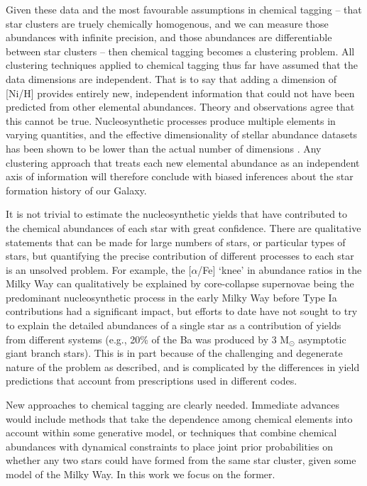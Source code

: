 \documentclass[twocolumn]{aastex62}
\begin{document}
Given these data and the most favourable assumptions in chemical tagging 
-- that star clusters are truely chemically homogenous, and we can measure 
those abundances with infinite precision, and those abundances are 
differentiable between star clusters -- then chemical
tagging becomes a clustering problem. All clustering techniques applied to 
chemical tagging thus far have assumed that the data dimensions are independent. That is to say
that adding a dimension of [Ni/H] provides entirely new, independent information
that could not have been predicted from other elemental abundances.
Theory and observations agree that this cannot be true.
Nucleosynthetic processes produce multiple elements in varying
quantities, and the effective dimensionality of stellar abundance datasets has been shown
to be lower than the actual number of dimensions \citep{Price-Jones:2018}.
Any clustering approach that treats each new elemental abundance as an 
independent axis of information will therefore conclude with biased inferences
about the star formation history of our Galaxy. 


It is not trivial to estimate
the nucleosynthetic yields that have contributed to the chemical abundances of each star
with great confidence. There are
qualitative statements that can be made for large numbers of stars, or particular
types of stars, but quantifying the precise contribution of different processes
to each star is an unsolved problem. For example, the [$\alpha$/Fe] `knee' in
abundance ratios in the Milky Way can qualitatively be explained by 
core-collapse supernovae being the predominant nucleosynthetic process in the
early Milky Way before Type Ia contributions had a significant impact, but 
efforts to date have not sought to try to explain the detailed abundances of a 
single star as a contribution of yields from different systems (e.g., 20\% of the
Ba was produced by 3 M$_\odot$ asymptotic giant branch stars). This is in part 
because of the challenging and degenerate nature of the problem as described, 
and is complicated by the differences in yield predictions that account from 
prescriptions used in different codes.


New approaches to chemical tagging are clearly needed. Immediate advances would
include methods that take the dependence among chemical elements into account
within some generative model, or techniques that combine chemical abundances
with dynamical constraints to place joint prior probabilities on whether any
two stars could have formed from the same star cluster, given some model of the
Milky Way. In this work we focus on the former. 
\end{document}
